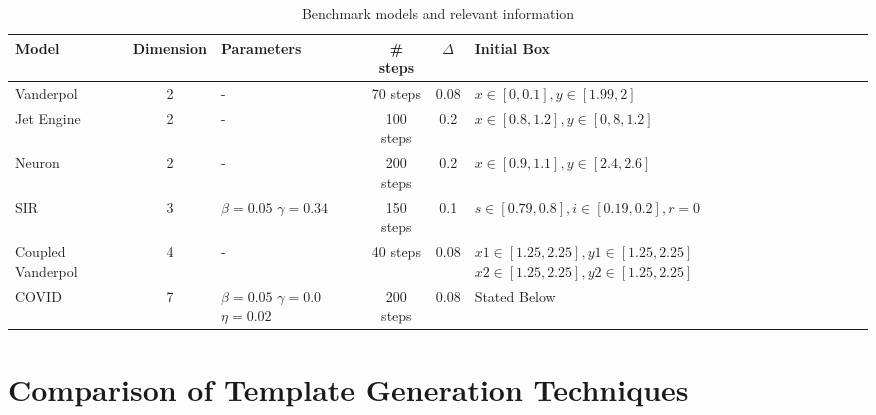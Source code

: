 \begin{table}
  \centering
\begin{tabular}{|p{1.5cm}|c|p{1.7cm}|c|c|p{5cm}|}
\hline
Model & Dimension & Parameters & \# steps & $\Delta$ & \hspace{1.5cm}Initial Box \\
\hline
Vanderpol & 2 & \quad \quad \; - & 70 steps & 0.08 & $x \in [0,0.1], y \in [1.99,2]$ \\
\hline
Jet Engine& 2 & \quad \quad \; - & 100 steps & 0.2 & $x \in [0.8,1.2], y \in [0,8,1.2]$ \\
\hline
Neuron \cite{fitzhugh1961impulses}& 2 & \quad \quad \; - & 200 steps & 0.2 & $x \in [0.9,1.1], y \in [2.4,2.6]$ \\
\hline
SIR& 3 & $\beta=0.05$ \newline $\gamma=0.34$ & 150 steps & 0.1 & $s \in [0.79,0.8], i \in [0.19,0.2], r = 0$ \\
\hline
Coupled \newline Vanderpol & 4 & \quad \quad \; - & 40 steps & 0.08 & $x1 \in [1.25, 2.25], y1 \in [1.25, 2.25]$ \newline $x2 \in [1.25, 2.25], y2 \in [1.25, 2.25]$ \\
\hline
COVID & 7 & $\beta=0.05$ \newline $\gamma=0.0$ \newline $\eta=0.02$ & 200 steps & 0.08 & \quad \quad \quad \; \; Stated Below\\
\hline
\end{tabular}
\caption{Benchmark models and relevant information}
\label{tab:modeldyns}
\end{table}
\section{Comparison of Template Generation Techniques}
\label{sec:compare}


